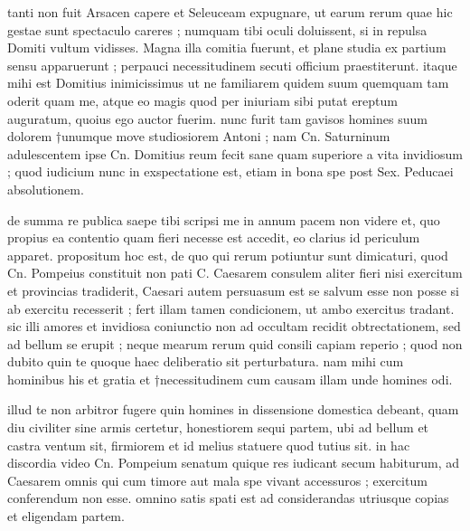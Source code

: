 


 tanti non fuit Arsacen capere et Seleuceam expugnare, ut earum rerum quae hic gestae sunt spectaculo careres ; numquam tibi oculi doluissent, si in repulsa Domiti vultum vidisses. Magna illa comitia fuerunt, et plane studia ex partium sensu apparuerunt ; perpauci necessitudinem secuti officium praestiterunt. itaque mihi est Domitius inimicissimus ut ne familiarem quidem suum quemquam tam oderit quam me, atque eo magis quod per iniuriam sibi putat ereptum auguratum, quoius ego auctor fuerim. nunc furit tam gavisos homines suum dolorem †unumque move studiosiorem Antoni ; nam Cn. Saturninum adulescentem ipse Cn. Domitius reum fecit sane quam superiore a vita invidiosum ; quod iudicium nunc in exspectatione est, etiam in bona spe post Sex. Peducaei absolutionem.

 de summa re publica saepe tibi scripsi me in annum pacem non videre et, quo propius ea contentio quam fieri necesse est accedit, eo clarius id periculum apparet. propositum hoc est, de quo qui rerum potiuntur sunt dimicaturi, quod Cn. Pompeius constituit non pati C. Caesarem consulem aliter fieri nisi exercitum et provincias tradiderit, Caesari autem persuasum est se salvum esse non posse si ab exercitu recesserit ; fert illam tamen condicionem, ut ambo exercitus tradant. sic illi amores et invidiosa coniunctio non ad occultam recidit obtrectationem, sed ad bellum se erupit ; neque mearum rerum quid consili capiam reperio ; quod non dubito quin te quoque haec deliberatio sit perturbatura. nam mihi cum hominibus his et gratia et †necessitudinem cum causam illam unde homines odi.

 illud te non arbitror fugere quin homines in dissensione domestica debeant, quam diu civiliter sine armis certetur, honestiorem sequi partem, ubi ad bellum et castra ventum sit, firmiorem et id melius statuere quod tutius sit. in hac discordia video Cn. Pompeium senatum quique res iudicant secum habiturum, ad Caesarem omnis qui cum timore aut mala spe vivant accessuros ; exercitum conferendum non esse. omnino satis spati est ad considerandas utriusque copias et eligendam partem.

